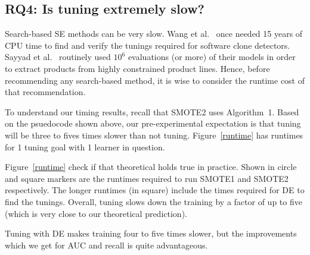 \subsection{\textbf{RQ4: Is tuning extremely slow?}}

Search-based SE methods can be very slow. Wang et al.~\cite{wang2013searching} once needed 15
years of CPU time to find and verify the tunings required for software
clone detectors. Sayyad et al.~\cite{sayyad2013scalable} routinely used
$10^6$ evaluations (or more) of their models in order to extract
products from highly constrained product
lines. Hence, before recommending any
search-based method, it is wise to consider the runtime cost of that
recommendation.

To understand our timing results, recall that SMOTE2 uses
Algorithm~1. Based on the psuedocode
shown above, our pre-experimental expectation is that
tuning will be three to fives times slower than not tuning. Figure~\ref{runtime} has runtimes for 1 tuning goal with 1 learner in question.
 
Figure~\ref{runtime} check if that theoretical
holds true in practice. Shown in circle and square markers are the
  runtimes required to run SMOTE1 and SMOTE2 respectively.  The
  longer runtimes (in square) include the times required for DE to find
  the tunings. Overall, tuning slows down the training by a factor of up to
  five (which is very close to our theoretical prediction).

\begin{lesson1}
    Tuning with DE makes training four to five times slower, but the improvements which we get for AUC and recall is quite advantageous.
\end{lesson1}
